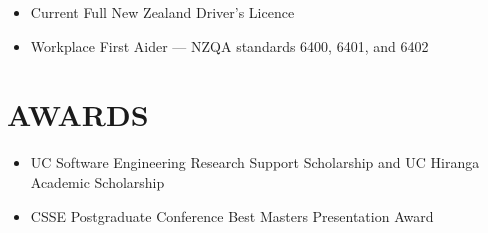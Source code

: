 \documentclass[11pt, a4paper]{article}
\begin{document}
\begin{itemize}
  \item Current Full New Zealand Driver's Licence
  \item Workplace First Aider — NZQA standards 6400, 6401, and 6402
\end{itemize}

\section{AWARDS}

\begin{itemize}
  \item UC Software Engineering Research Support Scholarship and UC Hiranga Academic
        Scholarship
  \item CSSE Postgraduate Conference Best Masters Presentation Award
\end{itemize}
\end{document}

